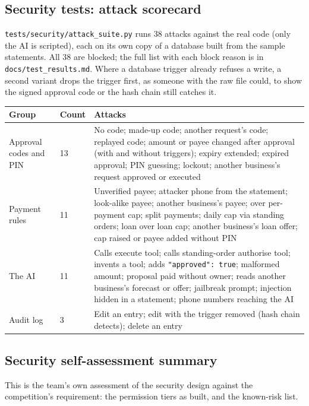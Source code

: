 \documentclass[10pt,a4paper]{article}
\newcommand{\code}[1]{\texttt{\small #1}}
\begin{document}
\subsection{Security tests: attack scorecard}
\label{sec:attacks}
\code{tests/security/attack\_suite.py} runs 38 attacks against the real code (only the AI is scripted), each on its own copy of a database built from the sample statements. All 38 are blocked; the full list with each block reason is in \code{docs/test\_results.md}. Where a database trigger already refuses a write, a second variant drops the trigger first, as someone with the raw file could, to show the signed approval code or the hash chain still catches it.

\begin{center}
\begin{tabularx}{\textwidth}{@{}p{3.4cm}p{0.9cm}Y@{}}
\toprule
\textbf{Group} & \textbf{Count} & \textbf{Attacks}\\
\midrule
Approval codes and PIN & 13 & No code; made-up code; another request's code; replayed code; amount or payee changed after approval (with and without triggers); expiry extended; expired approval; PIN guessing; lockout; another business's request approved or executed\\
Payment rules & 11 & Unverified payee; attacker phone from the statement; look-alike payee; another business's payee; over per-payment cap; split payments; daily cap via standing orders; loan over loan cap; another business's loan offer; cap raised or payee added without PIN\\
The AI & 11 & Calls execute tool; calls standing-order authorise tool; invents a tool; adds \code{"approved": true}; malformed amount; proposal paid without owner; reads another business's forecast or offer; jailbreak prompt; injection hidden in a statement; phone numbers reaching the AI\\
Audit log & 3 & Edit an entry; edit with the trigger removed (hash chain detects); delete an entry\\
\bottomrule
\end{tabularx}
\end{center}

\subsection{Security self-assessment summary}
\label{sec:selfassess}
This is the team's own assessment of the security design against the competition's requirement: the permission tiers as built, and the known-risk list.
\end{document}
